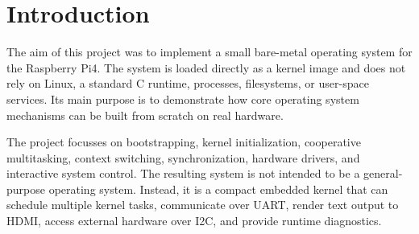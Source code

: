 \section{Introduction}

The aim of this project was to implement a small bare-metal operating system for the Raspberry Pi4. The system is loaded directly as a kernel image and does not rely on Linux, a standard C runtime, processes, filesystems, or user-space services. Its main purpose is to demonstrate how core operating system mechanisms can be built from scratch on real hardware.

The project focusses on bootstrapping, kernel initialization, cooperative multitasking, context switching, synchronization, hardware drivers, and interactive system control. The resulting system is not intended to be a general-purpose operating system. Instead, it is a compact embedded kernel that can schedule multiple kernel tasks, communicate over UART, render text output to HDMI, access external hardware over I2C, and provide runtime diagnostics.